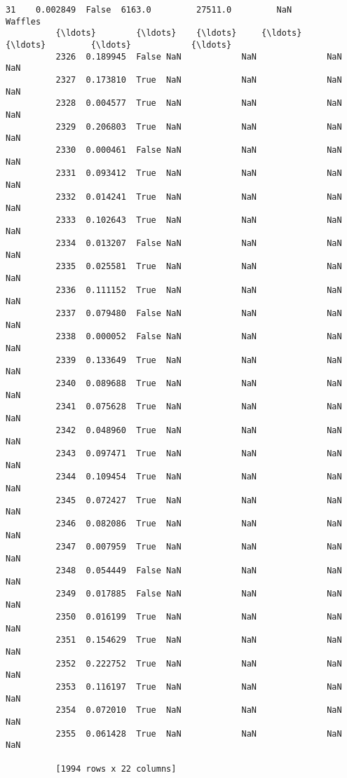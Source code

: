 \documentclass[11pt]{article}
\begin{document}
\begin{Verbatim}[commandchars=\\\{\}]
          31    0.002849  False  6163.0         27511.0         NaN        Waffles    
          {\ldots}        {\ldots}    {\ldots}     {\ldots}             {\ldots}         {\ldots}            {\ldots}    
          2326  0.189945  False NaN            NaN              NaN        NaN        
          2327  0.173810  True  NaN            NaN              NaN        NaN        
          2328  0.004577  True  NaN            NaN              NaN        NaN        
          2329  0.206803  True  NaN            NaN              NaN        NaN        
          2330  0.000461  False NaN            NaN              NaN        NaN        
          2331  0.093412  True  NaN            NaN              NaN        NaN        
          2332  0.014241  True  NaN            NaN              NaN        NaN        
          2333  0.102643  True  NaN            NaN              NaN        NaN        
          2334  0.013207  False NaN            NaN              NaN        NaN        
          2335  0.025581  True  NaN            NaN              NaN        NaN        
          2336  0.111152  True  NaN            NaN              NaN        NaN        
          2337  0.079480  False NaN            NaN              NaN        NaN        
          2338  0.000052  False NaN            NaN              NaN        NaN        
          2339  0.133649  True  NaN            NaN              NaN        NaN        
          2340  0.089688  True  NaN            NaN              NaN        NaN        
          2341  0.075628  True  NaN            NaN              NaN        NaN        
          2342  0.048960  True  NaN            NaN              NaN        NaN        
          2343  0.097471  True  NaN            NaN              NaN        NaN        
          2344  0.109454  True  NaN            NaN              NaN        NaN        
          2345  0.072427  True  NaN            NaN              NaN        NaN        
          2346  0.082086  True  NaN            NaN              NaN        NaN        
          2347  0.007959  True  NaN            NaN              NaN        NaN        
          2348  0.054449  False NaN            NaN              NaN        NaN        
          2349  0.017885  False NaN            NaN              NaN        NaN        
          2350  0.016199  True  NaN            NaN              NaN        NaN        
          2351  0.154629  True  NaN            NaN              NaN        NaN        
          2352  0.222752  True  NaN            NaN              NaN        NaN        
          2353  0.116197  True  NaN            NaN              NaN        NaN        
          2354  0.072010  True  NaN            NaN              NaN        NaN        
          2355  0.061428  True  NaN            NaN              NaN        NaN        
          
          [1994 rows x 22 columns]
\end{Verbatim}
            
\end{document}
